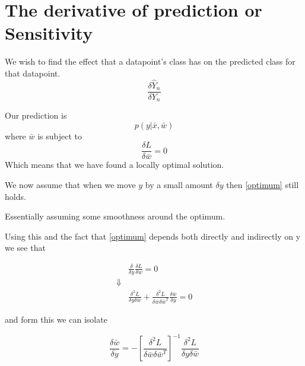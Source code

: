 
\section{The derivative of prediction or Sensitivity}
We wish to find the effect that a datapoint's class has on the predicted class for that datapoint.
\begin{equation}
\frac{\delta \hat{Y}_n}{\delta Y_n}
\end{equation}

Our prediction is 
\begin{equation}
p(y|\bar{x},\bar{w})
\end{equation}
where $\bar{w}$ is subject to 
\begin{equation}
\label{optimum}
\frac{\delta L}{\delta\bar{w}}=0
\end{equation}
Which means that we have found a locally optimal solution.

We now assume that when we move $y$ by a small amount $\delta y$ then \ref{optimum} still holds.

Essentially assuming some smoothness around the optimum.

Using this and the fact that \ref{optimum} depends both directly and indirectly on y we see that

\begin{eqnarray*}
&\frac{\delta}{\delta y} \frac{\delta L}{\delta w} = 0\\
\Downarrow & \\
&\frac{\delta^2 L}{\delta y \delta \bar{w}} + \frac{\delta^2 L}{\delta \bar{w} \delta \bar{w}^T} \frac{\delta \bar{w}}{\delta y}= 0
\end{eqnarray*}

and form this we can isolate

\begin{equation}
\frac{\delta \bar{w}}{\delta y} = - \left[ \frac{\delta^2 L}{\delta \bar{w} \delta \bar{w}^T} \right]^{-1} \frac{\delta^2 L}{\delta y \delta \bar{w}} 
\end{equation}





